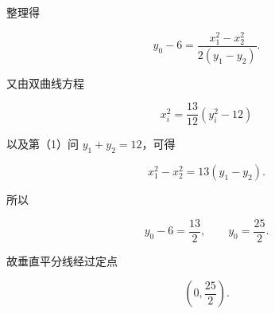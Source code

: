 \begin{answer}
整理得

\nopagebreak[4]
\[
y_0-6=\frac{x_1^2-x_2^2}{2(y_1-y_2)}.
\]

又由双曲线方程

\nopagebreak[4]
\[
x_i^2=\frac{13}{12}(y_i^2-12)
\]

以及第（1）问 $y_1+y_2=12$，可得

\nopagebreak[4]
\[
x_1^2-x_2^2=13(y_1-y_2).
\]

所以

\nopagebreak[4]
\[
y_0-6=\frac{13}{2},
\qquad
y_0=\frac{25}{2}.
\]

故垂直平分线经过定点

\nopagebreak[4]
\[
\left(0,\frac{25}{2}\right).
\]



\end{answer}